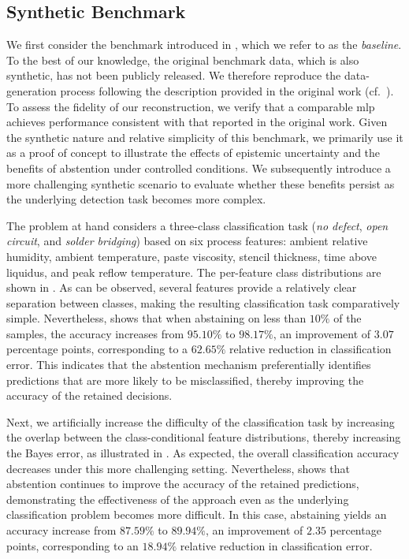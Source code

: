 \subsection{Synthetic Benchmark}
\label{subsec:synthetic-benchmark}
We first consider the benchmark introduced in \cite{shenoy2026uncertainty}, which we refer to as the \emph{baseline}. To the best of our knowledge, the original benchmark data, which is also synthetic, has not been publicly released. We therefore reproduce the data-generation process following the description provided in the original work (cf.~). To assess the fidelity of our reconstruction, we verify that a comparable \gls*{mlp} achieves performance consistent with that reported in the original work. Given the synthetic nature and relative simplicity of this benchmark, we primarily use it as a proof of concept to illustrate the effects of epistemic uncertainty and the benefits of abstention under controlled conditions. We subsequently introduce a more challenging synthetic scenario to evaluate whether these benefits persist as the underlying detection task becomes more complex.

The problem at hand considers a three-class classification task (\emph{no defect}, \emph{open circuit}, and \emph{solder bridging}) based on six process features: ambient relative humidity, ambient temperature, paste viscosity, stencil thickness, time above liquidus, and peak reflow temperature.
The per-feature class distributions are shown in . As can be observed, several features provide a relatively clear separation between classes, making the resulting classification task comparatively simple. Nevertheless,  shows that when abstaining on less than \(10\%\) of the samples, the accuracy increases from \(95.10\%\) to \(98.17\%\), an improvement of \(3.07\) percentage points, corresponding to a \(62.65\%\) relative reduction in classification error. This indicates that the abstention mechanism preferentially identifies predictions that are more likely to be misclassified, thereby improving the accuracy of the retained decisions.

Next, we artificially increase the difficulty of the classification task by increasing the overlap between the class-conditional feature distributions, thereby increasing the Bayes error, as illustrated in . As expected, the overall classification accuracy decreases under this more challenging setting. Nevertheless,  shows that abstention continues to improve the accuracy of the retained predictions, demonstrating the effectiveness of the approach even as the underlying classification problem becomes more difficult. In this case, abstaining yields an accuracy increase from \(87.59\%\) to \(89.94\%\), an improvement of \(2.35\) percentage points, corresponding to an \(18.94\%\) relative reduction in classification error.

